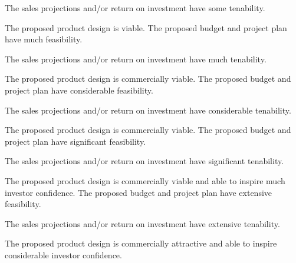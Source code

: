 \documentclass{../fal_assignment}
\begin{document}
\begin{markingrubric}
            \par The sales projections and/or return on investment have some tenability.
            \par The proposed product design is viable.
        \grade The proposed budget and project plan have much feasibility.
            \par The sales projections and/or return on investment have much tenability.
            \par The proposed product design is commercially viable.
        \grade The proposed budget and project plan have considerable feasibility.
            \par The sales projections and/or return on investment have considerable tenability.
            \par The proposed product design is commercially viable.
        \grade The proposed budget and project plan have significant feasibility.
            \par The sales projections and/or return on investment have significant tenability.
            \par The proposed product design is commercially viable and able to inspire much investor confidence.
        \grade The proposed budget and project plan have extensive feasibility.
            \par The sales projections and/or return on investment have extensive tenability.
            \par The proposed product design is commercially attractive and able to inspire considerable investor confidence.
\end{markingrubric}
\end{document}
